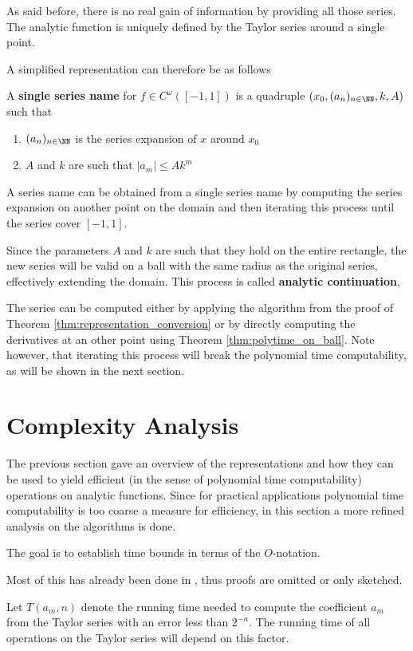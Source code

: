 		As said before, there is no real gain of information by providing all those series.
		The analytic function is uniquely defined by the Taylor series around a single point.

    A simplified representation can therefore be as follows
		\begin{definition}
			A \textbf{single series name} for $f \in C^\omega([-1,1])$ is a quadruple $(x_0, (a_n)_{n \in \NN}, k, A)$ such that
			\begin{enumerate}
				\item $(a_n)_{n \in \NN}$ is the series expansion of $x$ around $x_0$
				\item $A$ and $k$ are such that $| a_m | \leq Ak^m$ 
			\end{enumerate}
		\end{definition}
		A series name can be obtained from a single series name by computing the series expansion on another point on the domain and then iterating this process until the series cover $[-1,1]$.

		Since the parameters $A$ and $k$ are such that they hold on the entire rectangle, 
		the new series will be valid on a ball with the same radius as the original series, effectively extending the domain.
		This process is called \textbf{analytic continuation},
		
		The series can be computed either by applying the algorithm from the proof of Theorem \ref{thm:representation_conversion} or by directly computing the derivatives at an other point using Theorem \ref{thm:polytime_on_ball}.
		Note however, that iterating this process will break the polynomial time computability, as will be shown in the next
		section.
	\section{Complexity Analysis}
		The previous section gave an overview of the representations and how they can be used to yield efficient 
    (in the sense of polynomial time computability)	operations on analytic functions.
		Since for practical applications polynomial time computability is too coarse a measure for efficiency, 
		in this section a more refined analysis on the algorithms is done. 

		The goal is to establish time bounds in terms of the $O$-notation.
		
		Most of this has already been done in \cite{mypaper}, thus proofs are omitted or only sketched.

		Let $T(a_m, n)$ denote the running time needed to compute the coefficient $a_m$ from the Taylor series with an error 
		less than $2^{-n}$.
		The running time of all operations on the Taylor series will depend on this factor.

